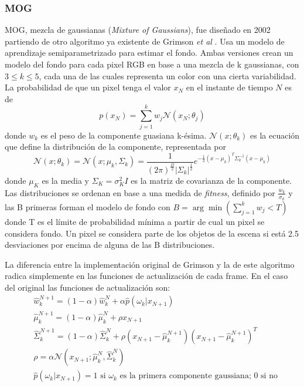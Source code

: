 \subsubsection*{MOG}
MOG, mezcla de gaussianas (\textit{Mixture of Gaussians}), fue diseñado en 2002 \cite{KaewTraKulPong2002} partiendo de otro algoritmo ya existente de Grimson \textit{et al} \cite{698583,784637,868677}. Usa un modelo de aprendizaje semiparametrizado para estimar el fondo. Ambas versiones crean un modelo del fondo para cada pixel RGB en base a una mezcla de k gaussianas, con $3\leq k \leq 5$, cada una de las cuales representa un color con una cierta variabilidad. La probabilidad de que un pixel tenga el valor $x_N$ en el instante de tiempo $N$ es de
\[
    p(x_N) = \sum_{j=1}^{k} w_j \mathcal{N} (x_N;\theta_j )
\]
donde $w_k$ es el peso de la componente guasiana k-ésima. $\mathcal{N} (x;\theta_k)$ es la ecuación que define la distribución de la componente, representada por
\[
    \mathcal{N}(x;\theta_k) = \mathcal{N}(x;\mu_k, \Sigma_k) = \frac{1}{(2\pi)^{\frac{D}{2}}|\Sigma_k|^\frac{1}{2}}e^{-\frac{1}{2}(x-\mu_k)^T\Sigma_k^{-1}(x-\mu_k)}
\]
donde $\mu_K$ es la media y $\Sigma_K = \sigma_K^2I$ es la matriz de covarianza de la componente. Las distribuciones se ordenan en base a una medida de \textit{fitness}, definido por $\frac{w_k}{\sigma_k}$ y las B primeras forman el modelo de fondo con $B = \arg\min (\sum_{j=1}^{k} w_j < T)$ donde T es el límite de probabilidad mínima a partir de cual un pixel se considera fondo. Un pixel se considera parte de los objetos de la escena si está 2.5 desviaciones por encima de alguna de las B distribuciones.

La diferencia entre la implementación original de Grimson y la de este algoritmo radica simplemente en las funciones de actualización de cada frame. En el caso del original las funciones de actualización son: 
\begin{align*}
    &\hat{w}_k^{N+1} = (1 - \alpha)\hat{w}_k^{N} + \alpha\hat{p}(\omega_k | x_{N+1}) \\
    &\hat{\mu}_k^{N+1} = (1 - \alpha)\hat{\mu}_k^{N} + \rho x_{N+1} \\
    &\hat{\Sigma}_k^{N+1} = (1 - \alpha)\hat{\Sigma}_k^{N} + \rho (x_{N+1} - \hat{\mu}_k^{N+1})(x_{N+1} - \hat{\mu}_k^{N+1})^T \\
    &\rho = \alpha \mathcal{N}(x_{N+1};\hat{\mu}_k^N, \hat{\Sigma}_k^N) \\
    &\hat{p}(\omega_k | x_{N+1}) = \text{1 si $\omega_k$ es la primera componente gaussiana; 0 si no}
\end{align*}

